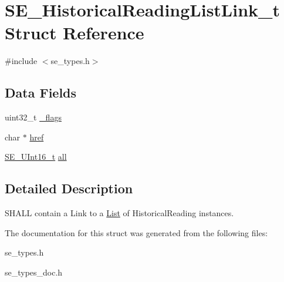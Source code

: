 \hypertarget{structSE__HistoricalReadingListLink__t}{}\section{S\+E\+\_\+\+Historical\+Reading\+List\+Link\+\_\+t Struct Reference}
\label{structSE__HistoricalReadingListLink__t}


{\ttfamily \#include $<$se\+\_\+types.\+h$>$}

\subsection*{Data Fields}
\begin{DoxyCompactItemize}
\item 
uint32\+\_\+t \hyperlink{group__HistoricalReadingListLink_ga6a915ba35644446ae6a70f7eec8aa2c4}{\+\_\+flags}
\item 
char $\ast$ \hyperlink{group__HistoricalReadingListLink_gaec0f08b36bb8f6e6f61a4aa74bd1bbcb}{href}
\item 
\hyperlink{group__UInt16_gac68d541f189538bfd30cfaa712d20d29}{S\+E\+\_\+\+U\+Int16\+\_\+t} \hyperlink{group__HistoricalReadingListLink_gaad484f3ec067fe1449f8cdc87af67ee0}{all}
\end{DoxyCompactItemize}


\subsection{Detailed Description}
S\+H\+A\+LL contain a Link to a \hyperlink{structList}{List} of Historical\+Reading instances. 

The documentation for this struct was generated from the following files\+:\begin{DoxyCompactItemize}
\item 
se\+\_\+types.\+h\item 
se\+\_\+types\+\_\+doc.\+h\end{DoxyCompactItemize}
